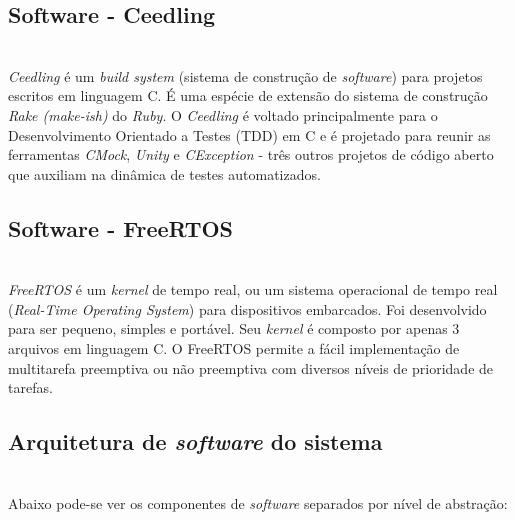\documentclass[times, twoside, watermark]{artigo}
\begin{document}
\subsection{Software - Ceedling}\hfill\\
\textit{Ceedling} é um \textit{build system} (sistema de construção de \textit{software}) para projetos escritos em linguagem C.
É uma espécie de extensão do sistema de construção \textit{Rake (make-ish)} do \textit{Ruby}.
O \textit{Ceedling} é voltado principalmente para o Desenvolvimento Orientado a Testes (TDD) em C e é projetado para reunir as ferramentas \textit{CMock},
\textit{Unity} e \textit{CException} - três outros projetos de código aberto que auxiliam na dinâmica de testes automatizados. \cite{gomes2016uttos}


\subsection{Software - FreeRTOS}\hfill\\
\textit{FreeRTOS} é um \textit{kernel} de tempo real, ou um sistema operacional de tempo real (\textit{Real-Time Operating System}) 
para dispositivos embarcados. Foi desenvolvido para ser pequeno, simples e portável. 
Seu \textit{kernel} é composto por apenas 3 arquivos em linguagem C. 
O FreeRTOS permite a fácil implementação de multitarefa preemptiva ou não preemptiva com diversos níveis de prioridade de tarefas.\cite{barry2008freertos}


\subsection{Arquitetura de \textit{software} do sistema}\hfill\\
Abaixo pode-se ver os componentes de \textit{software} separados por nível de abstração:





\end{document}
